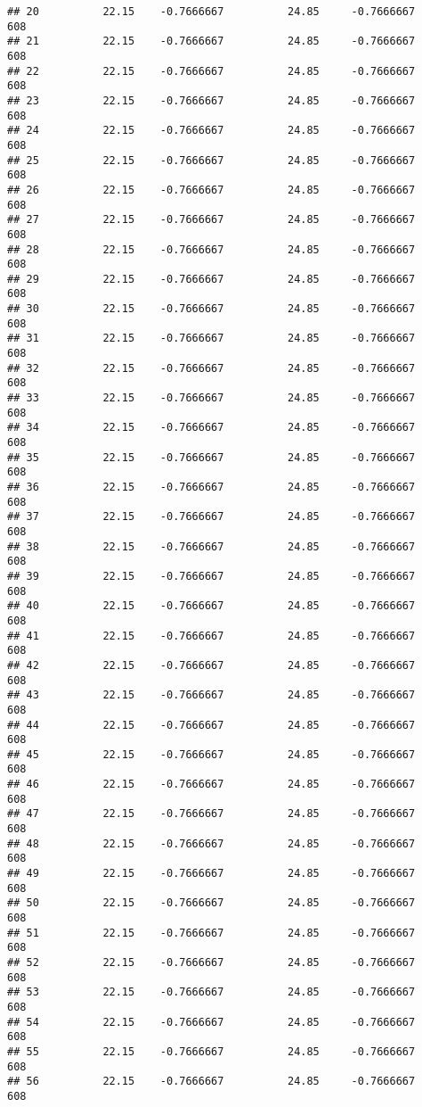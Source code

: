 \documentclass[]{article}
\begin{document}
\begin{verbatim}
## 20          22.15    -0.7666667          24.85     -0.7666667    608
## 21          22.15    -0.7666667          24.85     -0.7666667    608
## 22          22.15    -0.7666667          24.85     -0.7666667    608
## 23          22.15    -0.7666667          24.85     -0.7666667    608
## 24          22.15    -0.7666667          24.85     -0.7666667    608
## 25          22.15    -0.7666667          24.85     -0.7666667    608
## 26          22.15    -0.7666667          24.85     -0.7666667    608
## 27          22.15    -0.7666667          24.85     -0.7666667    608
## 28          22.15    -0.7666667          24.85     -0.7666667    608
## 29          22.15    -0.7666667          24.85     -0.7666667    608
## 30          22.15    -0.7666667          24.85     -0.7666667    608
## 31          22.15    -0.7666667          24.85     -0.7666667    608
## 32          22.15    -0.7666667          24.85     -0.7666667    608
## 33          22.15    -0.7666667          24.85     -0.7666667    608
## 34          22.15    -0.7666667          24.85     -0.7666667    608
## 35          22.15    -0.7666667          24.85     -0.7666667    608
## 36          22.15    -0.7666667          24.85     -0.7666667    608
## 37          22.15    -0.7666667          24.85     -0.7666667    608
## 38          22.15    -0.7666667          24.85     -0.7666667    608
## 39          22.15    -0.7666667          24.85     -0.7666667    608
## 40          22.15    -0.7666667          24.85     -0.7666667    608
## 41          22.15    -0.7666667          24.85     -0.7666667    608
## 42          22.15    -0.7666667          24.85     -0.7666667    608
## 43          22.15    -0.7666667          24.85     -0.7666667    608
## 44          22.15    -0.7666667          24.85     -0.7666667    608
## 45          22.15    -0.7666667          24.85     -0.7666667    608
## 46          22.15    -0.7666667          24.85     -0.7666667    608
## 47          22.15    -0.7666667          24.85     -0.7666667    608
## 48          22.15    -0.7666667          24.85     -0.7666667    608
## 49          22.15    -0.7666667          24.85     -0.7666667    608
## 50          22.15    -0.7666667          24.85     -0.7666667    608
## 51          22.15    -0.7666667          24.85     -0.7666667    608
## 52          22.15    -0.7666667          24.85     -0.7666667    608
## 53          22.15    -0.7666667          24.85     -0.7666667    608
## 54          22.15    -0.7666667          24.85     -0.7666667    608
## 55          22.15    -0.7666667          24.85     -0.7666667    608
## 56          22.15    -0.7666667          24.85     -0.7666667    608

\end{verbatim}
\end{document}
